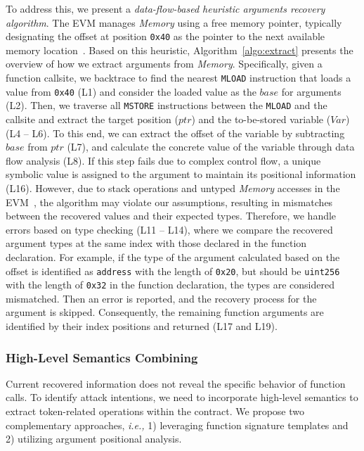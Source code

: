 To address this, we present a \textit{data-flow-based heuristic arguments recovery algorithm}.
The EVM manages \textit{Memory} using a free memory pointer, typically designating the offset at position \texttt{0x40} as the pointer to the next available memory location~\cite{sollang, pan2023automated}. 
Based on this heuristic, Algorithm~\ref{algo:extract} presents the overview of how we extract arguments from \textit{Memory}.
Specifically, given a function callsite, we backtrace to find the nearest \texttt{MLOAD} instruction that loads a value from \texttt{0x40} (L1) and consider the loaded value as the $base$ for arguments (L2). Then, we traverse all \texttt{MSTORE} instructions between the \texttt{MLOAD} and the callsite and extract the target position ($ptr$) and the to-be-stored variable ($Var$) (L4 -- L6). To this end, we can extract the offset of the variable by subtracting $base$ from $ptr$ (L7), and calculate the concrete value of the variable through data flow analysis (L8). If this step fails due to complex control flow, a unique symbolic value is assigned to the argument to maintain its positional information (L16). However, due to stack operations and untyped \textit{Memory} accesses in the EVM~\cite{li2024varlifter}, the algorithm may violate our assumptions, resulting in mismatches between the recovered values and their expected types. Therefore, we handle errors based on type checking (L11 -- L14), where we compare the recovered argument types at the same index with those declared in the function declaration. For example, if the type of the argument calculated based on the offset is identified as \texttt{address} with the length of \texttt{0x20}, but should be \texttt{uint256} with the length of \texttt{0x32} in the function declaration, the types are considered mismatched. Then an error is reported, and the recovery process for the argument is skipped. 
Consequently, the remaining function arguments are identified by their index positions and returned (L17 and L19). 




\subsubsection{High-Level Semantics Combining} 
\label{lab:semantics}
Current recovered information does not reveal the specific behavior of function calls. To identify attack intentions, we need to incorporate high-level semantics to extract token-related operations within the contract. We propose two complementary approaches, \textit{i.e.,} 1) leveraging function signature templates and 2) utilizing argument positional analysis. 

